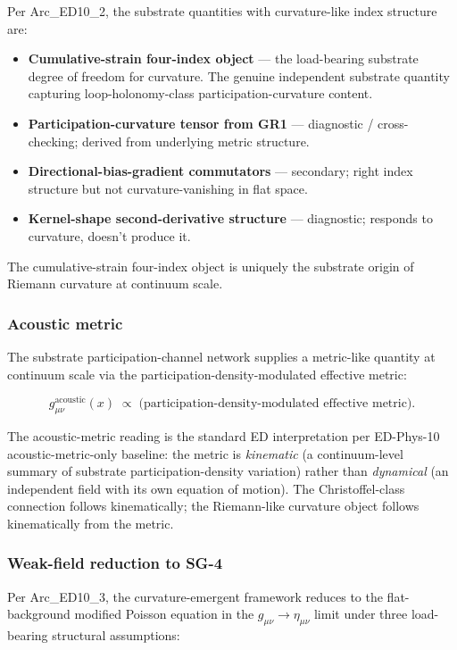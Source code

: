 \documentclass[
  11pt,a4paper]{article}
\providecommand{\tightlist}{%
  \setlength{\itemsep}{0pt}\setlength{\parskip}{0pt}}
\begin{document}
Per Arc\_ED10\_2, the substrate quantities with curvature-like index
structure are:

\begin{itemize}
\tightlist
\item
  \textbf{Cumulative-strain four-index object} --- the load-bearing
  substrate degree of freedom for curvature. The genuine independent
  substrate quantity capturing loop-holonomy-class
  participation-curvature content.
\item
  \textbf{Participation-curvature tensor from GR1} --- diagnostic /
  cross-checking; derived from underlying metric structure.
\item
  \textbf{Directional-bias-gradient commutators} --- secondary; right
  index structure but not curvature-vanishing in flat space.
\item
  \textbf{Kernel-shape second-derivative structure} --- diagnostic;
  responds to curvature, doesn't produce it.
\end{itemize}

The cumulative-strain four-index object is uniquely the substrate origin
of Riemann curvature at continuum scale.

\subsubsection{Acoustic metric}\label{acoustic-metric}

The substrate participation-channel network supplies a metric-like
quantity at continuum scale via the participation-density-modulated
effective metric:

\[g_{\mu\nu}^\mathrm{acoustic}(x) \;\propto\; \bigl(\text{participation-density-modulated effective metric}\bigr).\]

The acoustic-metric reading is the standard ED interpretation per
ED-Phys-10 acoustic-metric-only baseline: the metric is \emph{kinematic}
(a continuum-level summary of substrate participation-density variation)
rather than \emph{dynamical} (an independent field with its own equation
of motion). The Christoffel-class connection follows kinematically; the
Riemann-like curvature object follows kinematically from the metric.

\subsubsection{Weak-field reduction to
SG-4}\label{weak-field-reduction-to-sg-4}

Per Arc\_ED10\_3, the curvature-emergent framework reduces to the
flat-background modified Poisson equation in the
\(g_{\mu\nu}\to\eta_{\mu\nu}\) limit under three load-bearing structural
assumptions:
\end{document}

